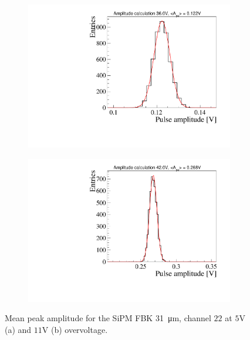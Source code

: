 \begin{figure}[htbp]
  \centering

  \begin{subfigure}{0.48\textwidth}
    \includegraphics[width=\textwidth]{gfx/plots/examples/peakamp_36V_FBK31.pdf}
    \caption{}
  \end{subfigure}
  \hfill
  \begin{subfigure}{0.48\textwidth}
    \includegraphics[width=\textwidth]{gfx/plots/examples/peakamp_42V_FBK31.pdf}
    \caption{}
  \end{subfigure}
  
  \caption{Mean peak amplitude for the SiPM FBK \SI{31}{\micro m}, channel $22$ at $5$V (a) and $11$V (b) overvoltage.}
  \label{fig:mean pulse amplitude}
\end{figure}
 


